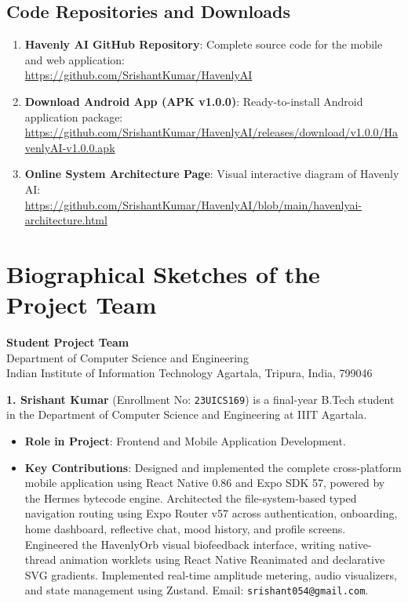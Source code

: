 \documentclass[USenglish,a4paper,12pt]{nitathesis}
\begin{document}
\section{Code Repositories and Downloads}
\begin{enumerate}
    \item \textbf{Havenly AI GitHub Repository}: Complete source code for the mobile and web application:\\
    \url{https://github.com/SrishantKumar/HavenlyAI}
    \item \textbf{Download Android App (APK v1.0.0)}: Ready-to-install Android application package:\\
    \url{https://github.com/SrishantKumar/HavenlyAI/releases/download/v1.0.0/HavenlyAI-v1.0.0.apk}
    \item \textbf{Online System Architecture Page}: Visual interactive diagram of Havenly AI:\\
    \url{https://github.com/SrishantKumar/HavenlyAI/blob/main/havenlyai-architecture.html}
\end{enumerate}

\chapter{Biographical Sketches of the Project Team}
\label{app:bio}

\begin{center}
{\textbf{\Large Student Project Team}}\\
Department of Computer Science and Engineering\\
Indian Institute of Information Technology Agartala, Tripura, India, 799046\\
\end{center}

\vspace{0.4cm}

\textbf{1. Srishant Kumar} (Enrollment No: \texttt{23UICS169}) is a final-year B.Tech student in the Department of Computer Science and Engineering at IIIT Agartala. 
\begin{itemize}
    \item \textbf{Role in Project}: Frontend and Mobile Application Development.
    \item \textbf{Key Contributions}: Designed and implemented the complete cross-platform mobile application using React Native 0.86 and Expo SDK 57, powered by the Hermes bytecode engine. Architected the file-system-based typed navigation routing using Expo Router v57 across authentication, onboarding, home dashboard, reflective chat, mood history, and profile screens. Engineered the HavenlyOrb visual biofeedback interface, writing native-thread animation worklets using React Native Reanimated and declarative SVG gradients. Implemented real-time amplitude metering, audio visualizers, and state management using Zustand. Email: \texttt{srishant054@gmail.com}.
\end{itemize}
\end{document}
